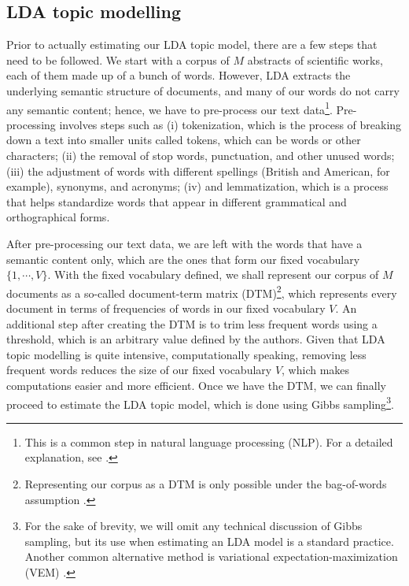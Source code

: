 \subsection{LDA topic modelling} \label{topic_modelling}

Prior to actually estimating our LDA topic model, there are a few steps that need to be followed. We start with a corpus of $M$ abstracts of scientific works, each of them made up of a bunch of words. However, LDA extracts the underlying semantic structure of documents, and many of our words do not carry any semantic content; hence, we have to pre-process our text data\footnote{This is a common step in natural language processing (NLP). For a detailed explanation, see \cite[p. 9-12]{ponweiser_latent_2012}.}. Pre-processing involves steps such as (i) tokenization, which is the process of breaking down a text into smaller units called tokens, which can be words or other characters; (ii) the removal of stop words, punctuation, and other unused words; (iii) the adjustment of words with different spellings (British and American, for example), synonyms, and acronyms; (iv) and lemmatization, which is a process that helps standardize words that appear in different grammatical and orthographical forms. 

After pre-processing our text data, we are left with the words that have a semantic content only, which are the ones that form our fixed vocabulary $\{1, \cdots, V \}$. With the fixed vocabulary defined, we shall represent our corpus of $M$ documents as a so-called document-term matrix (DTM)\footnote{Representing our corpus as a DTM is only possible under the bag-of-words assumption \citep{ponweiser_latent_2012}.}, which represents every document in terms of frequencies of words in our fixed vocabulary $V$. An additional step after creating the DTM is to trim less frequent words using a threshold, which is an arbitrary value defined by the authors. Given that LDA topic modelling is quite intensive, computationally speaking, removing less frequent words reduces the size of our fixed vocabulary $V$, which makes computations easier and more efficient. Once we have the DTM, we can finally proceed to estimate the LDA topic model, which is done using Gibbs sampling\footnote{For the sake of brevity, we will omit any technical discussion of Gibbs sampling, but its use when estimating an LDA model is a standard practice. Another common alternative method is variational expectation-maximization (VEM) \citep{grun_topicmodels_2011}.}.

